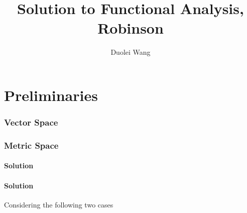 \documentclass{article}
\title{Solution to Functional Analysis, Robinson}
\author[1]{Duolei Wang}
\affil[1]{Department of Mathematics }
\date{}
\begin{document}
\linespread{2.0}

\begin{titlepage}
    \vspace*{\fill}
    \vspace*{\fill}
\end{titlepage}


\newpage

\tableofcontents


\newpage
\part[Preliminaries]{Preliminaries}
\section{Vector Space}


\section{Metric Space}

\subsection{Solution}

\subsection{Solution}
Considering the following two cases
\end{document}
